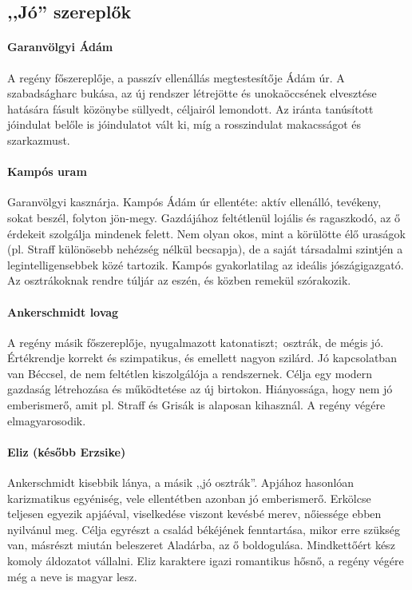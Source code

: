\documentclass{thesis-ekf}
\begin{document}
    \subsection{,,Jó'' szereplők}

    \paragraph{Garanvölgyi Ádám}
    A regény főszereplője, a passzív ellenállás megtestesítője Ádám úr.
    A szabadságharc bukása, az új rendszer létrejötte és unokaöccsének elvesztése hatására fásult közönybe süllyedt,
        céljairól lemondott.
    Az iránta tanúsított jóindulat belőle is jóindulatot vált ki, míg a rosszindulat makacsságot és szarkazmust.

    \paragraph{Kampós uram}
    Garanvölgyi kasznárja.
    Kampós Ádám úr ellentéte: aktív ellenálló, tevékeny, sokat beszél, folyton jön-megy.
    Gazdájához feltétlenül lojális és ragaszkodó, az ő érdekeit szolgálja mindenek felett.
    Nem olyan okos, mint a körülötte élő uraságok (pl.
    Straff különösebb nehézség nélkül becsapja), de a saját társadalmi szintjén a legintelligensebbek közé tartozik.
    Kampós gyakorlatilag az ideális jószágigazgató.
    Az osztrákoknak rendre túljár az eszén, és közben remekül szórakozik.

    \paragraph{Ankerschmidt lovag}
    A regény másik főszereplője, nyugalmazott katonatiszt;~osztrák, de mégis jó.
    Értékrendje korrekt és szimpatikus, és emellett nagyon szilárd.
    Jó kapcsolatban van Béccsel, de nem feltétlen kiszolgálója a rendszernek.
    Célja egy modern gazdaság létrehozása és működtetése az új birtokon.
    Hiányossága, hogy nem jó emberismerő, amit pl.
    Straff és Grisák is alaposan kihasznál.
    A regény végére elmagyarosodik.

    \paragraph{Eliz (később Erzsike)}
    Ankerschmidt kisebbik lánya, a másik ,,jó osztrák''.
    Apjához hasonlóan karizmatikus egyéniség, vele ellentétben azonban jó emberismerő.
    Erkölcse teljesen egyezik apjáéval, viselkedése viszont kevésbé merev, nőiessége ebben nyilvánul meg.
    Célja egyrészt a család békéjének fenntartása, mikor erre szükség van, másrészt miután beleszeret Aladárba, az ő boldogulása.
    Mindkettőért kész komoly áldozatot vállalni.
    Eliz karaktere igazi romantikus hősnő, a regény végére még a neve is magyar lesz.
\end{document}
